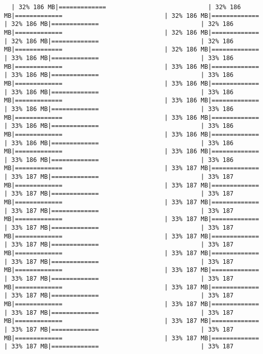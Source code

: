 \documentclass[
]{article}
\begin{document}
\begin{verbatim}
  | 32% 186 MB|=============                            | 32% 186 MB|=============                            | 32% 186 MB|=============                            | 32% 186 MB|=============                            | 32% 186 MB|=============                            | 32% 186 MB|=============                            | 32% 186 MB|=============                            | 32% 186 MB|=============                            | 32% 186 MB|=============                            | 33% 186 MB|=============                            | 33% 186 MB|=============                            | 33% 186 MB|=============                            | 33% 186 MB|=============                            | 33% 186 MB|=============                            | 33% 186 MB|=============                            | 33% 186 MB|=============                            | 33% 186 MB|=============                            | 33% 186 MB|=============                            | 33% 186 MB|=============                            | 33% 186 MB|=============                            | 33% 186 MB|=============                            | 33% 186 MB|=============                            | 33% 186 MB|=============                            | 33% 186 MB|=============                            | 33% 186 MB|=============                            | 33% 186 MB|=============                            | 33% 186 MB|=============                            | 33% 186 MB|=============                            | 33% 186 MB|=============                            | 33% 187 MB|=============                            | 33% 187 MB|=============                            | 33% 187 MB|=============                            | 33% 187 MB|=============                            | 33% 187 MB|=============                            | 33% 187 MB|=============                            | 33% 187 MB|=============                            | 33% 187 MB|=============                            | 33% 187 MB|=============                            | 33% 187 MB|=============                            | 33% 187 MB|=============                            | 33% 187 MB|=============                            | 33% 187 MB|=============                            | 33% 187 MB|=============                            | 33% 187 MB|=============                            | 33% 187 MB|=============                            | 33% 187 MB|=============                            | 33% 187 MB|=============                            | 33% 187 MB|=============                            | 33% 187 MB|=============                            | 33% 187 MB|=============                            | 33% 187 MB|=============                            | 33% 187 MB|=============                            | 33% 187 MB|=============                            | 33% 187 MB|=============                            | 33% 187 MB|=============                            | 33% 187 MB|=============                            | 33% 187 MB|=============                            | 33% 187 MB|=============                            | 33% 187 MB|=============                            | 33% 187 MB|=============                            | 33% 187 MB|=============                            | 33% 187 
\end{verbatim}
\end{document}
